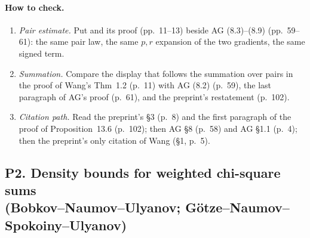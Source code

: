 \documentclass[11pt]{article}
\newcommand{\ploc}[2]{#1}
\newcommand{\sloc}[2]{\cite[#2]{#1}}
\begin{document}
\paragraph{How to check.}
\begin{enumerate}
\item \emph{Pair estimate.} Put
 \sloc{Wang2026-OptimalMixingGlauberSKBetaHalf}{Lemma~3.4, p.~10} and its
 proof (pp.~11--13) beside
 \ploc{AG (8.3)--(8.9) (pp.~59--61)}{terminal.tex:50--201}: the same pair
 law, the same $p,r$ expansion of the two gradients, the same signed term.
\item \emph{Summation.} Compare the display that follows the summation over
 pairs in the proof of Wang's Thm~1.2 (p.~11) with
 \ploc{AG (8.2) (p.~59)}{terminal.tex:32--46}, the last paragraph of AG's proof
 \ploc{(p.~61)}{terminal.tex:203--214}, and the preprint's restatement
 \ploc{(p.~102)}{profile-positive.tex:1585--1598}.
\item \emph{Citation path.} Read the preprint's
 \ploc{\S3 (p.~8)}{accepted-inputs.tex:91--94} and the first paragraph of the
 proof of \ploc{Proposition~13.6 (p.~102)}{profile-positive.tex:1585--1598};
 then \ploc{AG \S8 (p.~58)}{terminal.tex:8--11} and
 \ploc{AG \S1.1 (p.~4)}{introduction.tex:131--133}; then the preprint's only
 citation of Wang \ploc{(\S1, p.~5)}{introduction.tex:182--185}.
\end{enumerate}
\subsection[P2. Density bounds for weighted chi-square sums (Bobkov--Naumov--Ulyanov; G\"otze--Naumov--Spokoiny--Ulyanov)]{P2. Density bounds for weighted chi-square sums\\ (Bobkov--Naumov--Ulyanov; G\"otze--Naumov--Spokoiny--Ulyanov)}\label{f:P2}
\end{document}
